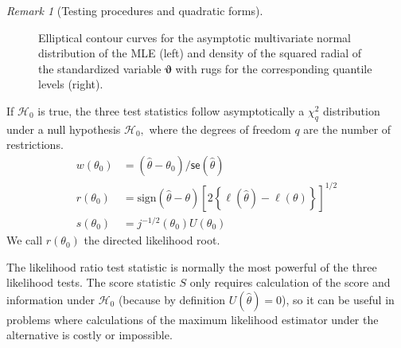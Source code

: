 \documentclass[
  11pt,
  letterpaper,
]{scrbook}
\theoremstyle{plain}
\theoremstyle{definition}
\theoremstyle{definition}
\theoremstyle{plain}
\theoremstyle{remark}
\newtheorem{refremark}{Remark}[chapter]
\begin{document}
\begin{refremark}[Testing procedures and quadratic forms]
\begin{figure}[ht!]
{}

\caption{\label{fig-ellipses}Elliptical contour curves for the
asymptotic multivariate normal distribution of the MLE (left) and
density of the squared radial of the standardized variable
\(\boldsymbol{\vartheta}\) with rugs for the corresponding quantile
levels (right).}

\end{figure}%

\label{rem-nulldist}

\end{refremark}

If \(\mathscr{H}_0\) is true, the three test statistics follow
asymptotically a \(\chi^2_q\) distribution under a null hypothesis
\(\mathscr{H}_0,\) where the degrees of freedom \(q\) are the number of
restrictions. \begin{align*}
w(\theta_0)&=(\widehat{\theta}-\theta_0)/\mathsf{se}(\widehat{\theta}) \\
r({\theta_0}) &= \mathrm{sign}(\widehat{\theta}-\theta)\left[2
\left\{\ell(\widehat{\theta})-\ell(\theta)\right\}\right]^{1/2} \\
s(\theta_0)&=j^{-1/2}(\theta_0)U(\theta_0)
\end{align*} We call \(r({\theta_0})\) the directed likelihood root.

The likelihood ratio test statistic is normally the most powerful of the
three likelihood tests. The score statistic \(S\) only requires
calculation of the score and information under \(\mathscr{H}_0\)
(because by definition \(U(\widehat{\theta})=0\)), so it can be useful
in problems where calculations of the maximum likelihood estimator under
the alternative is costly or impossible.
\end{document}
